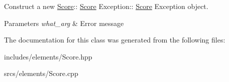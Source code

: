 Construct a new \hyperlink{class_score}{Score}\+:\+: \hyperlink{class_score}{Score} Exception\+:\+: \hyperlink{class_score}{Score} Exception object. 


\begin{DoxyParams}{Parameters}
{\em what\+\_\+arg} & Error message \\
\hline
\end{DoxyParams}


The documentation for this class was generated from the following files\+:\begin{DoxyCompactItemize}
\item 
includes/elements/Score.\+hpp\item 
srcs/elements/Score.\+cpp\end{DoxyCompactItemize}
